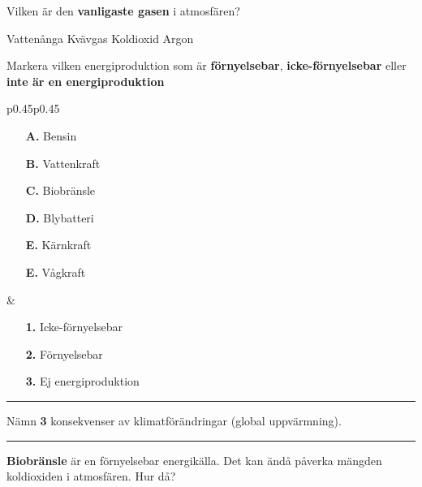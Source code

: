 \documentclass{exam}
\begin{document}
\begin{questions}
\question Vilken är den \textbf{vanligaste gasen} i atmosfären?
\begin{checkboxes}
   \choice Vattenånga
   \correctchoice Kvävgas
   \choice Koldioxid
   \choice Argon
\end{checkboxes}

\break


\vspace{5mm} %
\begin{center}
\end{center}
\vspace{5mm} %
\question Markera vilken energiproduktion som är \textbf{förnyelsebar}, \textbf{icke-förnyelsebar} eller \textbf{inte är en energiproduktion}

\begin{tabular}{p{0.45\textwidth}p{0.45\textwidth}}
  \begin{minipage}[t]{\linewidth}
    \begin{itemize}
      \item[\textbf{A.}] Bensin
      \item[\textbf{B.}] Vattenkraft
      \item[\textbf{C.}] Biobränsle
      \item[\textbf{D.}] Blybatteri
      \item[\textbf{E.}] Kärnkraft
      \item[\textbf{E.}] Vågkraft
    \end{itemize}
  \end{minipage}
  &
  \begin{minipage}[t]{\linewidth}
    \begin{itemize}
      \item[\textbf{1.}] Icke-förnyelsebar
      \item[\textbf{2.}] Förnyelsebar
      \item[\textbf{3.}] Ej energiproduktion
    \end{itemize}
  \end{minipage}
\end{tabular}
\vspace{5mm} 
\hrule 
\vspace{5mm}
\question 
Nämn \textbf{3} konsekvenser av klimatförändringar (global uppvärmning).

\vspace{60mm} 
\hrule 
\vspace{5mm}
\question 
\textbf{Biobränsle} är en förnyelsebar energikälla. Det kan ändå påverka mängden koldioxiden i atmosfären. Hur då?


\end{questions}
\end{document}
